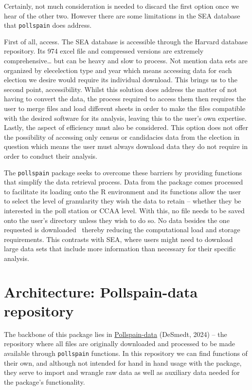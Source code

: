\documentclass[
  letterpaper,
  DIV=11,
  numbers=noendperiod]{scrreprt}
\begin{document}
Certainly, not much consideration is needed to discard the first option
once we hear of the other two. However there are some limitations in the
SEA database that \texttt{pollspain} does address.

First of all, access. The SEA database is accessible through the Harvard
database repository. Its 974 excel file and compressed versions are
extremely comprehensive\ldots{} but can be heavy and slow to process.
Not mention data sets are organized by elecelection type and year which
means accessing data for each election we desire would require its
individual download. This brings us to the second point, accessibility.
Whilst this solution does address the matter of not having to convert
the data, the process required to access them then requires the user to
merge files and load different sheets in order to make the files
compatible with the desired software for its analysis, leaving this to
the user's own expertise. Lastly, the aspect of efficiency must also be
considered. This option does not offer the possibility of accessing only
census or candidacies data from the election in question which means the
user must always download data they do not require in order to conduct
their analysis.

The \texttt{pollspain} package seeks to overcome these barriers by
providing functions that simplify the data retrieval process. Data from
the package comes processed to facilitate its loading onto the R
environment and its functions allow the user to select the level of
granularity they wish the data to retain -- whether they be interested
in the poll station or CCAA level. With this, no file needs to be saved
onto the user's directory unless they wish to do so. No data besides the
one requested is downloaded ~thereby reducing the computational load and
storage requirements. This contrasts with SEA, where users might need to
download large data sets that include more information than necessary
for their specific analysis.


\hypertarget{architecture-pollspain-data-repository}{%
\chapter{Architecture: Pollspain-data
repository}\label{architecture-pollspain-data-repository}}

The backbone of this package lies in
\href{https://github.com/mikadsr/Pollspain-data}{Pollspain-data}
(DeSmedt, 2024) -- the repository where all files are originally
downloaded and processed to be made available through \texttt{pollspain}
functions. In this repository we can find functions of their own, and
although not intended for hand in hand usage with the package, they
serve to import and wrangle raw data as well as auxiliary data needed
for the package's functionality.
\end{document}
